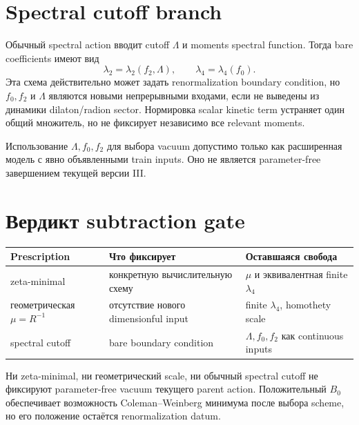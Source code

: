 \section{Spectral cutoff branch}

Обычный spectral action вводит cutoff \(\Lambda\) и moments spectral
function. Тогда bare coefficients имеют вид
\begin{equation}
 \lambda_2=\lambda_2(f_2,\Lambda),
 \qquad
 \lambda_4=\lambda_4(f_0).
\end{equation}
Эта схема действительно может задать renormalization boundary condition,
но \(f_0,f_2\) и \(\Lambda\) являются новыми непрерывными входами, если не
выведены из динамики dilaton/radion sector. Нормировка scalar kinetic term
устраняет один общий множитель, но не фиксирует независимо все relevant
moments.

\begin{nogocriterion}
Использование \(\Lambda,f_0,f_2\) для выбора vacuum допустимо только как
расширенная модель с явно объявленными train inputs. Оно не является
parameter-free завершением текущей версии III.
\end{nogocriterion}

\section{Вердикт subtraction gate}

\begin{center}
\begin{tabular}{p{}p{}p{}}
\toprule
Prescription & Что фиксирует & Оставшаяся свобода \\
\midrule
zeta-minimal & конкретную вычислительную схему & \(\mu\) и эквивалентная finite \(\lambda_4\) \\
геометрическая \(\mu=R^{-1}\) & отсутствие нового dimensionful input & finite \(\lambda_4\), homothety scale \\
spectral cutoff & bare boundary condition & \(\Lambda,f_0,f_2\) как continuous inputs \\
\bottomrule
\end{tabular}
\end{center}

\begin{theorem}
Ни zeta-minimal, ни геометрический scale, ни обычный spectral cutoff не
фиксируют parameter-free vacuum текущего parent action. Положительный
\(B_0\) обеспечивает возможность Coleman--Weinberg минимума после выбора
scheme, но его положение остаётся renormalization datum.
\end{theorem}

